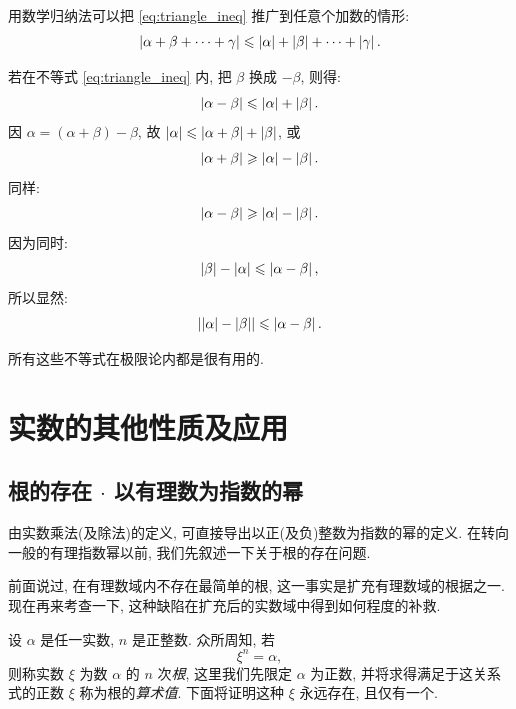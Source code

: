 用数学归纳法可以把 \eqref{eq:triangle_ineq} 推广到任意个加数的情形:
\begin{equation}\label{eq:triangle_ineq_general}
\left| \alpha + \beta + \cdots + \gamma \right| \leqslant \left| \alpha \right| + \left| \beta \right| + \cdots + \left| \gamma \right|.
\end{equation}

若在不等式 \eqref{eq:triangle_ineq} 内, 把 $\beta$ 换成 $-\beta$, 则得:
$$ \left| \alpha - \beta \right| \leqslant \left| \alpha \right| + \left| \beta \right|. $$
因 $\alpha = (\alpha + \beta) - \beta$, 故 $\left| \alpha \right| \leqslant \left| \alpha + \beta \right| + \left| \beta \right|$, 或
$$ \left| \alpha + \beta \right| \geqslant \left| \alpha \right| - \left| \beta \right|. $$
同样:
$$ \left| \alpha - \beta \right| \geqslant \left| \alpha \right| - \left| \beta \right|. $$
因为同时:
$$ \left| \beta \right| - \left| \alpha \right| \leqslant \left| \alpha - \beta \right|, $$
所以显然:
\begin{equation}\label{eq:triangle_ineq_diff}
\left|  \left| \alpha \right| - \left| \beta \right|  \right| \leqslant \left| \alpha - \beta \right|.
\end{equation}

所有这些不等式在极限论内都是很有用的.

\section{实数的其他性质及应用}

\subsection{\texorpdfstring{根的存在 $\cdot$ 以有理数为指数的幂}{根的存在·以有理数为指数的幂}} \label{subsec:18}

由实数乘法(及除法)的定义, 可直接导出以正(及负)整数为指数的幂的定义.
在转向一般的有理指数幂以前, 我们先叙述一下关于根的存在问题.

前面说过, 在有理数域内不存在最简单的根, 这一事实是扩充有理数域的根据之一.
现在再来考查一下, 这种缺陷在扩充后的实数域中得到如何程度的补救.

设 $\alpha$ 是任一实数, $n$ 是正整数.
众所周知, 若
$$ \xi^n = \alpha, $$
则称实数 $\xi$ 为数 $\alpha$ 的 $n$ 次\emph{根},
这里我们先限定 $\alpha$ 为正数, 并将求得满足于这关系式的正数 $\xi$ 称为根的\emph{算术值}.
下面将证明这种 $\xi$ 永远存在, 且仅有一个.

